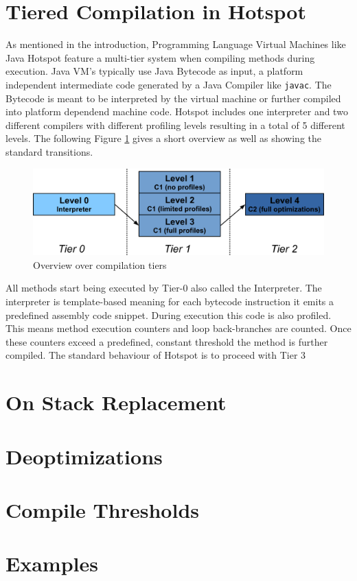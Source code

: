 \section{Tiered Compilation in Hotspot}
As mentioned in the introduction, Programming Language Virtual Machines like Java Hotspot feature a multi-tier system when compiling methods during execution. 
Java VM's typically use Java Bytecode as input, a platform independent intermediate code generated by a Java Compiler like \texttt{javac}.
The Bytecode is meant to be interpreted by the virtual machine or further compiled into platform dependend machine code.
Hotspot includes one interpreter and two different compilers with different profiling levels resulting in a total of 5 different levels. The following Figure \ref{fig:hs_tiers} gives a short overview as well as showing the standard transitions.
\begin{figure}[h]
  \begin{center}
    \centering
    \includegraphics{figures/hs_tiers.png}
    \caption{Overview over compilation tiers}
    \label{fig:hs_tiers}
  \end{center}
\end{figure}

All methods start being executed by Tier-0 also called the Interpreter.
The interpreter is template-based meaning for each bytecode instruction it emits a predefined assembly code snippet.
During execution this code is also profiled. This means method execution counters and loop back-branches are counted. Once these counters exceed a predefined, constant threshold the method is further compiled.
The standard behaviour of Hotspot is to proceed with Tier 3

\section{On Stack Replacement}

\section{Deoptimizations}

\section{Compile Thresholds}

\section{Examples}
